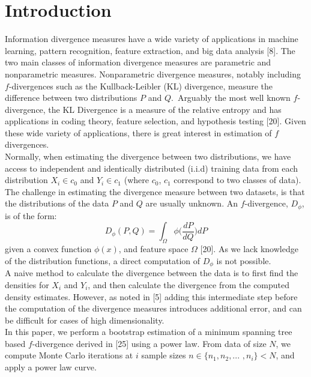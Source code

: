 \documentclass{article}
\begin{document}
	\section{Introduction} 
	Information divergence measures have a wide variety of applications in machine learning, pattern recognition, feature extraction, and big data analysis [8]. The two main classes of information divergence measures are parametric and nonparametric measures. Nonparametric divergence measures, notably including $f$-divergences such as the Kullback-Leibler (KL) divergence,  measure the difference between two distributions $P$ and $Q$.\ Arguably the most well known $f$-divergence, the KL Divergence is a measure of the relative entropy and has applications in coding theory, feature selection, and hypothesis testing [20].	Given these wide variety of applications, there is great interest in estimation of $f$ divergences.
	\\ [0.5ex] %
	\indent Normally, when estimating the divergence between two distributions, we have access to independent and identically distributed (i.i.d) training data from each distribution $X_i \in c_0$ and $Y_i \in c_1$ (where $c_0$, $c_1$ correspond to two classes of data). The challenge in estimating the divergence measure between two datasets, is that the distributions of the data $P$ and $Q$ are usually unknown. An $f$-divergence, $D_\phi$, is of the form: \begin{equation} D_\phi(P, Q) = \int_{\Omega} \phi\bigg(\frac{dP}{dQ}\bigg)dP \end{equation} given a convex function $\phi(x)$, and feature space $\Omega$ [20].
 	As we lack knowledge of the distribution functions, a direct computation of $D_\phi$ is not possible.
 	\\ [0.5ex]
 	\indent A naive method to calculate the divergence between the data is to first find the densities for $X_i$ and $Y_i$, and then calculate the divergence from the computed density estimates. However, as noted in [5] adding this intermediate step before the computation of the divergence measures introduces additional error, and can be difficult for cases of high dimensionality. 
	\\ [0.5ex]
	\indent	In this paper, we perform a bootstrap estimation of a minimum spanning tree based $f$-divergence derived in [25] using a power law. From data of size $N$, we compute  Monte Carlo iterations at $i$ sample sizes $n\in \{n_1, n_2,... $ $,n_i\}<N$, and apply a power law curve.
\end{document}
